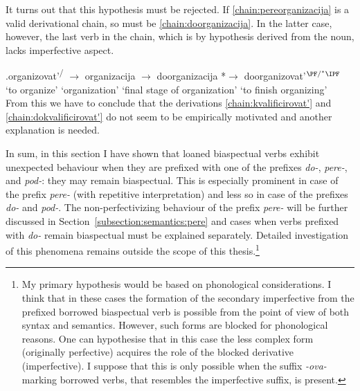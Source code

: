 It turns out that this hypothesis must be rejected. If \ref{chain:pereorganizacija} is a valid derivational chain, so must be \ref{chain:doorganizacija}. In the latter case, however, the last verb in the chain, which is by hypothesis derived from the noun, lacks imperfective aspect. 

\exg.\label{chain:doorganizacija}organizovat'\textsuperscript{\PF\slash\IPF} {$\rightarrow$} organizacija {$\rightarrow$} doorganizacija {*$\rightarrow$} {doorganizovat'$^{{\PF}/^*{\IPF}}$}\\
{`to organize'} {} `organization' {} {`final stage of organization'} {} {`to finish organizing'}\\

From this we have to conclude that the derivations \ref{chain:kvalificirovat'} and \ref{chain:dokvalificirovat'} do not seem to be empirically motivated and another explanation is needed. 

In sum, in this section I have shown that loaned biaspectual verbs exhibit unexpected behaviour when they are prefixed with one of the prefixes \textit{do-}, \textit{pere-}, and \textit{pod-}: they may remain biaspectual. This is especially prominent in case of the prefix \textit{pere-} (with repetitive interpretation) and less so in case of the prefixes \textit{do-} and \textit{pod-}. The non-perfectivizing behaviour of the prefix \textit{pere-} will be further discussed in Section~\ref{subsection:semantics:pere} and cases when verbs prefixed with \textit{do-} remain biaspectual must be explained separately. Detailed investigation of this phenomena remains outside the scope of this thesis.\footnote{My primary hypothesis would be based on phonological considerations. I think that in these cases the formation of the secondary imperfective from the prefixed borrowed biaspectual verb is possible from the point of view of both syntax and semantics. However, such forms are blocked for phonological reasons. One can hypothesise that in this case the less complex form (originally perfective) acquires the role of the blocked derivative (imperfective). I suppose that this is only possible when the suffix \textit{-ova-} marking borrowed verbs, that resembles the imperfective suffix, is present.}
	

